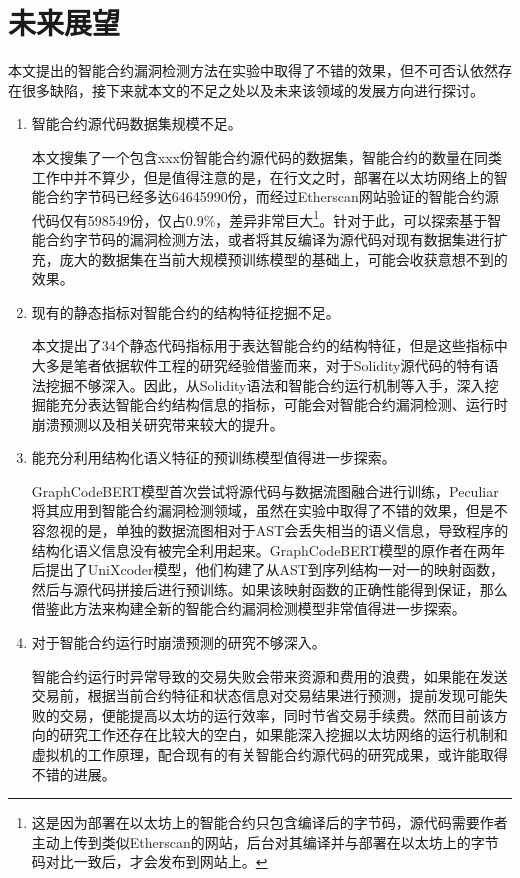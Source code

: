 \section{未来展望}
\label{sec:未来展望}

本文提出的智能合约漏洞检测方法在实验中取得了不错的效果，但不可否认依然存在很多缺陷，接下来就本文的不足之处以及未来该领域的发展方向进行探讨。

\begin{enumerate}[label=(\arabic*)]
    \item 智能合约源代码数据集规模不足。
    
    本文搜集了一个包含xxx份智能合约源代码的数据集，智能合约的数量在同类工作中并不算少，但是值得注意的是，在行文之时，部署在以太坊网络上的智能合约字节码已经多达\num{64645990}份，而经过Etherscan网站验证的智能合约源代码仅有\num{598549}份，仅占0.9\%，差异非常巨大\footnote{这是因为部署在以太坊上的智能合约只包含编译后的字节码，源代码需要作者主动上传到类似Etherscan的网站，后台对其编译并与部署在以太坊上的字节码对比一致后，才会发布到网站上。}。针对于此，可以探索基于智能合约字节码的漏洞检测方法，或者将其反编译为源代码对现有数据集进行扩充，庞大的数据集在当前大规模预训练模型的基础上，可能会收获意想不到的效果。

    \item 现有的静态指标对智能合约的结构特征挖掘不足。
    
    本文提出了34个静态代码指标用于表达智能合约的结构特征，但是这些指标中大多是笔者依据软件工程的研究经验借鉴而来，对于Solidity源代码的特有语法挖掘不够深入。因此，从Solidity语法和智能合约运行机制等入手，深入挖掘能充分表达智能合约结构信息的指标，可能会对智能合约漏洞检测、运行时崩溃预测以及相关研究带来较大的提升。
    
    \item 能充分利用结构化语义特征的预训练模型值得进一步探索。
    
    GraphCodeBERT\cite{guo2020graphcodebert}模型首次尝试将源代码与数据流图融合进行训练，Peculiar\cite{wu2021peculiar}将其应用到智能合约漏洞检测领域，虽然在实验中取得了不错的效果，但是不容忽视的是，单独的数据流图相对于AST会丢失相当的语义信息，导致程序的结构化语义信息没有被完全利用起来。GraphCodeBERT模型的原作者在两年后提出了UniXcoder模型，他们构建了从AST到序列结构一对一的映射函数，然后与源代码拼接后进行预训练。如果该映射函数的正确性能得到保证，那么借鉴此方法来构建全新的智能合约漏洞检测模型非常值得进一步探索。

    \item 对于智能合约运行时崩溃预测的研究不够深入。
    
    智能合约运行时异常导致的交易失败会带来资源和费用的浪费，如果能在发送交易前，根据当前合约特征和状态信息对交易结果进行预测，提前发现可能失败的交易，便能提高以太坊的运行效率，同时节省交易手续费。然而目前该方向的研究工作还存在比较大的空白，如果能深入挖掘以太坊网络的运行机制和虚拟机的工作原理，配合现有的有关智能合约源代码的研究成果，或许能取得不错的进展。
\end{enumerate}

